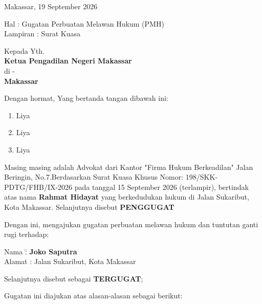\documentclass[12pt,a4paper]{article}
\begin{document}
\begin{flushright}
Makassar, 19 September 2026
\end{flushright}

Hal \> : \> Gugatan Perbuatan Melawan Hukum (PMH)\\
Lampiran \> : \> Surat Kuasa\\


\vspace{0.5cm}

Kepada Yth.\\
\textbf{Ketua Pengadilan Negeri Makassar}\\
di - \\
\quad \textbf{Makassar}

Dengan hormat,
Yang bertanda tangan dibawah ini:
\begin{enumerate}
    \item Liya
    \item Liya
    \item Liya
\end{enumerate}
Masing masing adalah Advokat dari Kantor "Firma Hukum Berkeadilan" Jalan Beringin, No.7.Berdasarkan Surat Kuasa Khusus Nomor: 198/SKK-PDTG/FHB/IX-2026 pada tanggal 15 September 2026 (terlampir), bertindak atas nama \textbf{Rahmat Hidayat} yang berkedudukan hukum di Jalan Sukaribut, Kota Makassar.
Selanjutnya disebut \textbf{PENGGUGAT}

Dengan ini, mengajukan gugatan perbuatan melawan hukum dan tuntutan ganti rugi terhadap:
\begin{tabbing}
    Nama \quad\quad\quad\quad \= : \textbf{Joko Saputra}\\
    Alamat \> : Jalan Sukaribut, Kota Makassar\\
\end{tabbing}
Selanjutnya disebut sebagai \textbf{TERGUGAT};

Gugatan ini diajukan atas alasan-alasan sebagai berikut:
\end{document}
